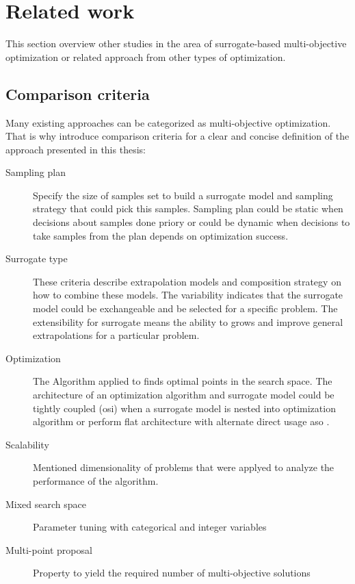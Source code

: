 \chapter{Related work}\label{sec:related}

    This section overview other studies in the area of surrogate-based multi-objective optimization or related approach from other types of optimization.


    \section{Comparison criteria}
        Many existing approaches can be categorized as multi-objective optimization. That is why introduce comparison criteria for a clear and concise definition of the approach presented in this thesis:
        \begin{description}
            \item[Sampling plan] Specify the size of samples set to build a surrogate model and sampling strategy that could pick this samples. Sampling plan could be static when decisions about samples done priory or could be dynamic when decisions to take samples from the plan depends on optimization success.
            \item[Surrogate type] These criteria describe extrapolation models and composition strategy on how to combine these models. The variability indicates that the surrogate model could be exchangeable and be selected for a specific problem. The extensibility for surrogate means the ability to grows and improve general extrapolations for a particular problem.
            \item[Optimization] The Algorithm applied to finds optimal points in the search space. The architecture of an optimization algorithm and surrogate model could be tightly coupled (\gls{osi}) when a surrogate model is nested into optimization algorithm or perform flat architecture with alternate direct usage \gls{aso} \cite{FigueiraA14}.
            \item[Scalability] Mentioned dimensionality of problems that were applyed to analyze the performance of the algorithm.
            \item[Mixed search space] Parameter tuning with categorical and integer variables
            \item[Multi-point proposal] Property to yield the required number of multi-objective solutions 
        \end{description}

